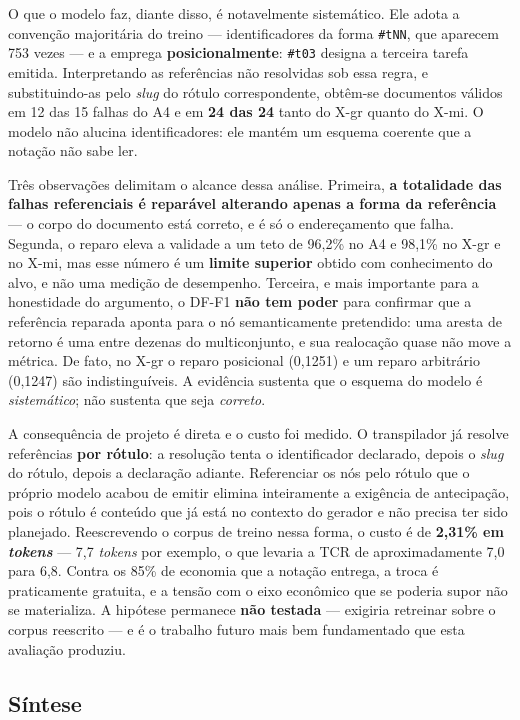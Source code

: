 O que o modelo faz, diante disso, é notavelmente sistemático. Ele adota a convenção majoritária do treino --- identificadores da forma \verb|#tNN|, que aparecem 753 vezes --- e a emprega \textbf{posicionalmente}: \verb|#t03| designa a terceira tarefa emitida. Interpretando as referências não resolvidas sob essa regra, e substituindo-as pelo \textit{slug} do rótulo correspondente, obtêm-se documentos válidos em 12 das 15 falhas do A4 e em \textbf{24 das 24} tanto do X-gr quanto do X-mi. O modelo não alucina identificadores: ele mantém um esquema coerente que a notação não sabe ler.

Três observações delimitam o alcance dessa análise. Primeira, \textbf{a totalidade das falhas referenciais é reparável alterando apenas a forma da referência} --- o corpo do documento está correto, e é só o endereçamento que falha. Segunda, o reparo eleva a validade a um teto de 96,2\% no A4 e 98,1\% no X-gr e no X-mi, mas esse número é um \textbf{limite superior} obtido com conhecimento do alvo, e não uma medição de desempenho. Terceira, e mais importante para a honestidade do argumento, o DF-F1 \textbf{não tem poder} para confirmar que a referência reparada aponta para o nó semanticamente pretendido: uma aresta de retorno é uma entre dezenas do multiconjunto, e sua realocação quase não move a métrica. De fato, no X-gr o reparo posicional (0,1251) e um reparo arbitrário (0,1247) são indistinguíveis. A evidência sustenta que o esquema do modelo é \textit{sistemático}; não sustenta que seja \textit{correto}.

A consequência de projeto é direta e o custo foi medido. O transpilador já resolve referências \textbf{por rótulo}: a resolução tenta o identificador declarado, depois o \textit{slug} do rótulo, depois a declaração adiante. Referenciar os nós pelo rótulo que o próprio modelo acabou de emitir elimina inteiramente a exigência de antecipação, pois o rótulo é conteúdo que já está no contexto do gerador e não precisa ter sido planejado. Reescrevendo o corpus de treino nessa forma, o custo é de \textbf{2,31\% em \textit{tokens}} --- 7,7 \textit{tokens} por exemplo, o que levaria a TCR de aproximadamente 7,0 para 6,8. Contra os 85\% de economia que a notação entrega, a troca é praticamente gratuita, e a tensão com o eixo econômico que se poderia supor não se materializa. A hipótese permanece \textbf{não testada} --- exigiria retreinar sobre o corpus reescrito --- e é o trabalho futuro mais bem fundamentado que esta avaliação produziu.

\subsection{Síntese}
\label{subsec:res-sintese}


